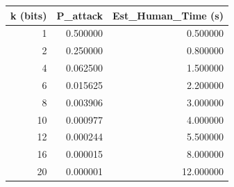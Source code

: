 \begin{tabular}{rrr}
\toprule
k (bits) & P_attack & Est_Human_Time (s) \\
\midrule
1 & 0.500000 & 0.500000 \\
2 & 0.250000 & 0.800000 \\
4 & 0.062500 & 1.500000 \\
6 & 0.015625 & 2.200000 \\
8 & 0.003906 & 3.000000 \\
10 & 0.000977 & 4.000000 \\
12 & 0.000244 & 5.500000 \\
16 & 0.000015 & 8.000000 \\
20 & 0.000001 & 12.000000 \\
\bottomrule
\end{tabular}

